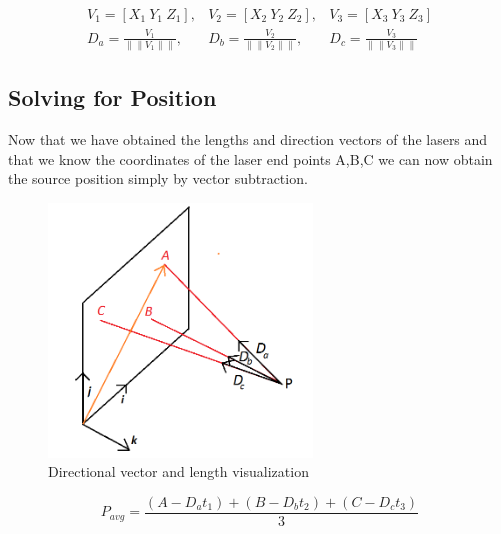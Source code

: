\documentclass[a4paper]{article}
\begin{document}
\begin{equation}
\begin{aligned}
V_1=[X_1 \ Y_1 \ Z_1 ], & V_2=[X_2 \ Y_2 \ Z_2 ], & V_3=[X_3 \ Y_3 \ Z_3 ] \\
D_a=\frac{V_1}{\|\|V_1\|\|}, & D_b=\frac{V_2}{\|\|V_2\|\|}, & D_c=\frac{V_3}{\|\|V_3\|\|}
\end{aligned}
\end{equation}

\subsection{Solving for Position}
Now that we have obtained the lengths and direction vectors of the lasers and that we know the coordinates of the laser end points A,B,C we can now obtain the source position simply by vector subtraction. 

\begin{figure}
	\includegraphics[width=7cm]{resection_fig3.png}
	\caption{Directional vector and length visualization}
\end{figure}

\begin{equation}
P_{avg}=\frac{(A-D_a t_1 )+ (B-D_b t_2 )+(C-D_c t_3 )}{3}
\end{equation}
\end{document}
